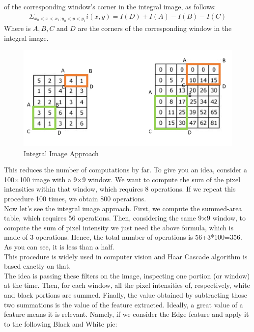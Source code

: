             of the corresponding window’s corner in the integral image, as follows:
            \begin{align}
                \Sigma_{x_0 < x < x_1; y_0 < y < y_1} i(x,y) = I(D) + I(A) - I(B) - I(C)
            \end{align}
            Where is $A,B,C$ and $D$ are the corners of the corresponding window in the integral image.
            \begin{figure}[H]
                \centering
                \includegraphics[width=0.6\linewidth]{img/corners_corresponding.png}
                \caption{Integral Image Approach}
            \end{figure}
            This reduces the number of computations by far. To give you an idea, consider a 100×100 image with a 9×9 window. We want to compute the sum of the pixel intensities within that window, which requires 8 operations. If we repeat this procedure 100 times, we obtain 800 operations. \\
            \vspace{3mm}
            Now let’s see the integral image approach. First, we compute the summed-area table, which requires 56 operations. Then, considering the same 9×9 window, to compute the sum of pixel intensity we just need the above formula, which is made of 3 operations. Hence, the total number 
            of operations is 56+3*100=356. As you can see, it is less than a half. \\
            \vspace{3mm}
            This procedure is widely used in computer vision and Haar Cascade algorithm is based exactly on that. \\
            \vspace{3mm}
            The idea is passing these filters on the image, inspecting one portion (or window) at the time. Then, for each window, all the pixel intensities of, respectively, white and black portions are summed. Finally, the value obtained by subtracting those two summations is the value 
            of the feature extracted. Ideally, a great value of a feature means it is relevant. Namely, if we consider the Edge feature and apply it to the following Black and White pic:
